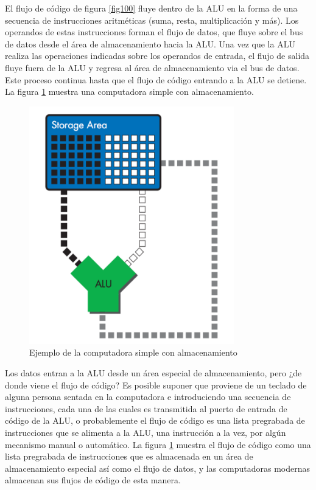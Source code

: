 \documentclass[12pt]{book}
\theoremstyle{definition}
\theoremstyle{remark}
\theoremstyle{plain}
\begin{document}
El flujo de código de figura \ref{fig100} fluye dentro de la ALU en la forma de una secuencia de instrucciones aritméticas (suma, resta, multiplicación y más). Los operandos de estas instrucciones forman el flujo de datos, que fluye sobre el bus de datos desde el área de almacenamiento hacia la ALU. Una vez que la ALU realiza las operaciones indicadas sobre los operandos de entrada, el flujo de salida fluye fuera de la ALU y regresa al área de almacenamiento via el bus de datos. Este proceso continua hasta que el flujo de código entrando a la ALU se detiene. La figura \ref{fig102} muestra una computadora simple con almacenamiento.


\begin{figure}
\centering
\includegraphics[width=3.5in]{almacenamiento.png}
\caption{Ejemplo de la computadora simple con almacenamiento}
\label{fig102}
\end{figure}



Los datos entran a la ALU desde un área especial de almacenamiento, pero ¿de donde viene el flujo de código? Es posible suponer que proviene de un teclado de alguna persona sentada en la computadora e introduciendo una secuencia de instrucciones, cada una de las cuales es transmitida al puerto de entrada de código de la ALU, o probablemente el flujo de código es una lista pregrabada de instrucciones que se alimenta a la ALU, una instrucción a la vez, por algún mecanismo manual o automático. La figura \ref{fig102} muestra el flujo de código como una lista pregrabada de instrucciones que es almacenada en un área de almacenamiento especial así como el flujo de datos, y las computadoras modernas almacenan sus flujos de código de esta manera.
\end{document}
